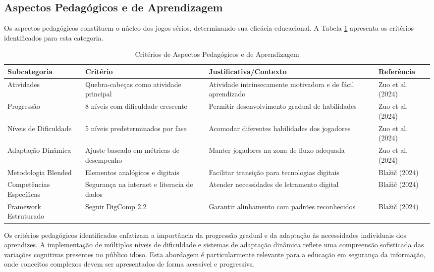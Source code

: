 \subsection{Aspectos Pedagógicos e de Aprendizagem}
\label{subsec:pedagogicos}

Os aspectos pedagógicos constituem o núcleo dos jogos sérios, determinando sua eficácia educacional. A Tabela \ref{tab:pedagogicos} apresenta os critérios identificados para esta categoria.

\begin{table}[H]
\centering
\caption{Critérios de Aspectos Pedagógicos e de Aprendizagem}
\label{tab:pedagogicos}
\begin{tabular}{p{2.5cm}p{3cm}p{5cm}p{3cm}}
\hline
\textbf{Subcategoria} & \textbf{Critério} & \textbf{Justificativa/Contexto} & \textbf{Referência} \\ \hline
Atividades & Quebra-cabeças como atividade principal & Atividade intrinsecamente motivadora e de fácil aprendizado & Zuo et al. (2024) \\
Progressão & 8 níveis com dificuldade crescente & Permitir desenvolvimento gradual de habilidades & Zuo et al. (2024) \\
Níveis de Dificuldade & 5 níveis predeterminados por fase & Acomodar diferentes habilidades dos jogadores & Zuo et al. (2024) \\
Adaptação Dinâmica & Ajuste baseado em métricas de desempenho & Manter jogadores na zona de fluxo adequada & Zuo et al. (2024) \\
Metodologia Blended & Elementos analógicos e digitais & Facilitar transição para tecnologias digitais & Blažič (2024) \\
Competências Específicas & Segurança na internet e literacia de dados & Atender necessidades de letramento digital & Blažič (2024) \\
Framework Estruturado & Seguir DigComp 2.2 & Garantir alinhamento com padrões reconhecidos & Blažič (2024) \\
\hline
\end{tabular}
\end{table}

Os critérios pedagógicos identificados enfatizam a importância da progressão gradual e da adaptação às necessidades individuais dos aprendizes. A implementação de múltiplos níveis de dificuldade e sistemas de adaptação dinâmica reflete uma compreensão sofisticada das variações cognitivas presentes no público idoso. Esta abordagem é particularmente relevante para a educação em segurança da informação, onde conceitos complexos devem ser apresentados de forma acessível e progressiva.

